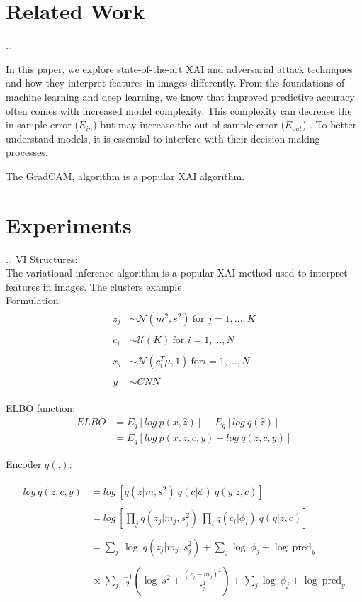 \documentclass[12pt]{article}
\begin{document}
\section{Related Work}
\ldots

In this paper, we explore state-of-the-art XAI and adversarial attack techniques and how they interpret features in images differently. 
From the foundations of machine learning and deep learning, we know that improved predictive accuracy often comes with increased model complexity. 
This complexity can decrease the in-sample error ($E_{in}$) but may increase the out-of-sample error ($E_{out}$) \cite{Shalev-Shwartz2014, Devroye1996, Hastie2017}. 
To better understand models, it is essential to interfere with their decision-making processes.

The GradCAM\cite{Selvaraju2020}, algorithm is a popular XAI algorithm. 
\section{Experiments}
\ldots
VI Structures:\\

The variational inference algorithm is a popular XAI method used to interpret features in images.
The clusters example\cite{Blei2017} \\

Formulation:
\begin{align} 
  \begin{split}
z_j & \sim \mathcal{N}(m^2, s^2)~\text{for } j = 1, ..., K \\\\
c_i & \sim \mathcal{U}(K)~\text{for } i = 1, ..., N \\\\ 
x_i & \sim \mathcal{N}(c_i^T \mu, 1)~\text{for} i = 1, ..., N \\\\
y  & \sim CNN
  \end{split}
\end{align}

ELBO function:
\begin{align}
ELBO & = E_q[log~p(x,\hat{z})] - E_q[log~q(\hat{z})]\\
 &= E_q[log~p(x,z,c,y) - log~q(z,c,y)]
\end{align}

Encoder $q(.)$:


\begin{align}
  \begin{split}
log~ q(z,c,y) &= log~[q(z|m, s^2)~q(c| \phi)~q(y|z,c)] \\\\
 &= log~\left[ \prod_j q(z_{j}| m_j, s_j^2)~\prod_i q(c_i| \phi_i)~q(y| z,c) \right]\\\\
&= \sum_{j}~\log~q(z_{j}| m_j, s_j^2) +  \sum_{j} \log~ \phi_{j} + \log~ \text{pred}_{y} \\ \\
&\propto \sum_{j}~ \frac{-1}{2}\left( \log~s^2 + \frac{(z_{j}-m_{j})^2}{s_{j}^2} \right)+\sum_{j} \log~ \phi_{j} + \log~ \text{pred}_{y}
  \end{split}
\end{align}
\end{document}
